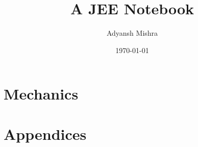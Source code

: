 \documentclass[twoside, a4paper, 10pt]{memoir}
\begin{document}

    \author{Adyansh Mishra}
    \date{\today}
    \title{A JEE Notebook}
    
    \frontmatter
    \fncytitle 
    \tableofcontents
    \clearpage
    \listoffigures
    \restoregeometry
    
    
    
    \mainmatter
    \setcounter{chapter}{-1}
    
    

    \part{Mechanics}
    \parttoc
    
    
    \part{Appendices}
    \appendix

    \backmatter
    \printindex
\end{document}
